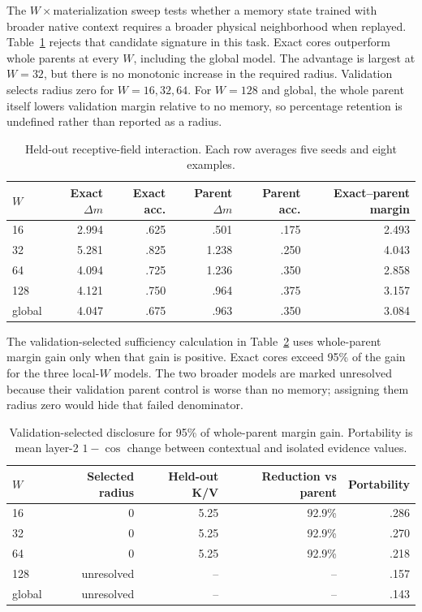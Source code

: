 \documentclass[11pt]{article}
\begin{document}
The $W\times$materialization sweep tests whether a memory state trained with broader native context
requires a broader physical neighborhood when replayed.  Table~\ref{tab:window} rejects that
candidate signature in this task.  Exact cores outperform whole parents at every $W$, including
the global model.  The advantage is largest at $W=32$, but there is no monotonic increase in the
required radius.  Validation selects radius zero for $W=16,32,64$.  For $W=128$ and global, the
whole parent itself lowers validation margin relative to no memory, so percentage retention is
undefined rather than reported as a radius.

\begin{table}[H]
\centering
\caption{Held-out receptive-field interaction.  Each row averages five seeds and eight examples.}
\label{tab:window}
\small
\begin{tabular}{lrrrrr}
\toprule
$W$ & Exact $\Delta m$ & Exact acc. & Parent $\Delta m$ & Parent acc. & Exact--parent margin \\
\midrule
16 & 2.994 & .625 & .501 & .175 & 2.493 \\
32 & 5.281 & .825 & 1.238 & .250 & 4.043 \\
64 & 4.094 & .725 & 1.236 & .350 & 2.858 \\
128 & 4.121 & .750 & .964 & .375 & 3.157 \\
global & 4.047 & .675 & .963 & .350 & 3.084 \\
\bottomrule
\end{tabular}
\end{table}

The validation-selected sufficiency calculation in Table~\ref{tab:minradius} uses whole-parent
margin gain only when that gain is positive.  Exact cores exceed 95\% of the gain for the three
local-$W$ models.  The two broader models are marked unresolved because their validation parent
control is worse than no memory; assigning them radius zero would hide that failed denominator.

\begin{table}[H]
\centering
\caption{Validation-selected disclosure for 95\% of whole-parent margin gain.  Portability is
mean layer-2 $1-\cos$ change between contextual and isolated evidence values.}
\label{tab:minradius}
\small
\begin{tabular}{lrrrr}
\toprule
$W$ & Selected radius & Held-out K/V & Reduction vs parent & Portability \\
\midrule
16 & 0 & 5.25 & 92.9\% & .286 \\
32 & 0 & 5.25 & 92.9\% & .270 \\
64 & 0 & 5.25 & 92.9\% & .218 \\
128 & unresolved & -- & -- & .157 \\
global & unresolved & -- & -- & .143 \\
\bottomrule
\end{tabular}
\end{table}
\end{document}
